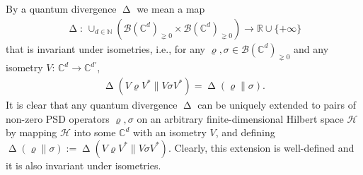 \documentclass[unsortedaddress,superscriptaddress,pra,notitlepage]{revtex4}
\def\B{{\mathcal B}}
\def\bN{\mathbb{N}}
\def\bC{\mathbb{C}}
\def\bR{\mathbb{R}}
\def\rho{\varrho}
\def\hil{{\mathcal H}}
\def\bz{\left(}
\def\jz{\right)}
\def\pne{_{\gneq 0}}
\DeclareMathOperator{\divv}{\Delta}
\begin{document}
By a quantum divergence $\divv$ we mean a map 
\begin{align*}
\divv:\,\cup_{d\in\bN}\bz\B(\bC^d)\pne\times\B(\bC^d)\pne\jz\to\bR\cup\{+\infty\}
\end{align*}
that is invariant under isometries, i.e., 
for any $\rho,\sigma\in\B(\bC^d)\pne$ and any isometry $V:\,\bC^d\to\bC^{d'}$, 
\begin{align*}
\divv\bz V\rho V^*\|V\sigma V^*\jz=\divv(\rho\|\sigma).
\end{align*}
It is clear that any quantum divergence $\divv$ can be uniquely extended to pairs of 
non-zero PSD operators $\rho,\sigma$ on an arbitrary finite-dimensional Hilbert space $\hil$ by 
mapping $\hil$ into some $\bC^d$ with an isometry $V$, and defining 
$\divv(\rho\|\sigma):=\divv(V\rho V^*\|V\sigma V^*)$. Clearly, this extension is 
well-defined and it is also invariant under isometries. 
\end{document}
